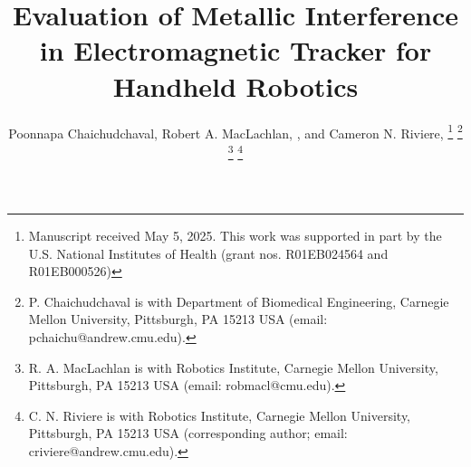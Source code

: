 \documentclass[journal,twoside,web]{ieeecolor}
\begin{document}
\title{Evaluation of Metallic Interference in Electromagnetic Tracker for Handheld Robotics}
\author{Poonnapa Chaichudchaval, Robert A. MacLachlan, , and Cameron N. Riviere, 
\thanks{Manuscript received May 5, 2025. This work was supported in part by the U.S. National Institutes of Health (grant nos. R01EB024564 and R01EB000526)}
\thanks{P. Chaichudchaval is with Department of Biomedical Engineering, Carnegie Mellon University, Pittsburgh, PA 15213 USA (email: pchaichu@andrew.cmu.edu). }
\thanks{R. A. MacLachlan is with Robotics Institute, Carnegie Mellon University, Pittsburgh, PA 15213 USA (email: robmacl@cmu.edu). }
\thanks{C. N. Riviere is with Robotics Institute, Carnegie Mellon University, Pittsburgh, PA 15213 USA (corresponding author; email: criviere@andrew.cmu.edu).
}}
\end{document}
